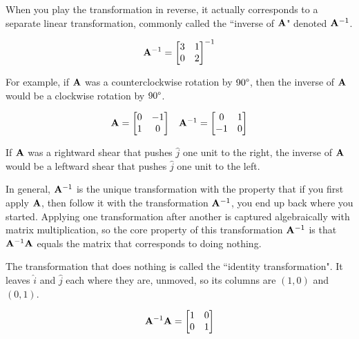 When you play the transformation in reverse, it actually corresponds to a
separate linear transformation, commonly called the ``inverse of $\mathbf{A}$"
denoted $\mathbf{A}^{-1}$.

\begin{equation*}
  \mathbf{A}^{-1} =
  \begin{bmatrix}
    3 & 1 \\
    0 & 2
  \end{bmatrix}^{-1}
\end{equation*}

For example, if $\mathbf{A}$ was a counterclockwise rotation by $90 \degree$, then
the inverse of $\mathbf{A}$ would be a clockwise rotation by $90 \degree$.

\begin{equation*}
  \begin{array}{cc}
  \mathbf{A} =
  \begin{bmatrix}
    0 & -1 \\
    1 & 0
  \end{bmatrix} &
  \mathbf{A}^{-1} =
  \begin{bmatrix}
    0 & 1 \\
    -1 & 0
  \end{bmatrix}
  \end{array}
\end{equation*}

If $\mathbf{A}$ was a rightward shear that pushes $\hat{j}$ one unit to the right,
the inverse of $\mathbf{A}$ would be a leftward shear that pushes $\hat{j}$ one
unit to the left.

In general, $\mathbf{A}^{-1}$ is the unique transformation with the property that
if you first apply $\mathbf{A}$, then follow it with the transformation
$\mathbf{A}^{-1}$, you end up back where you started. Applying one transformation
after another is captured algebraically with matrix multiplication, so the core
property of this transformation $\mathbf{A}^{-1}$ is that $\mathbf{A}^{-1}\mathbf{A}$
equals the matrix that corresponds to doing nothing.

The transformation that does nothing is called the ``identity transformation".
It leaves $\hat{i}$ and $\hat{j}$ each where they are, unmoved, so its columns
are $(1, 0)$ and $(0, 1)$.

\begin{equation*}
  \mathbf{A}^{-1}\mathbf{A} =
  \begin{bmatrix}
    1 & 0 \\
    0 & 1
  \end{bmatrix}
\end{equation*}

